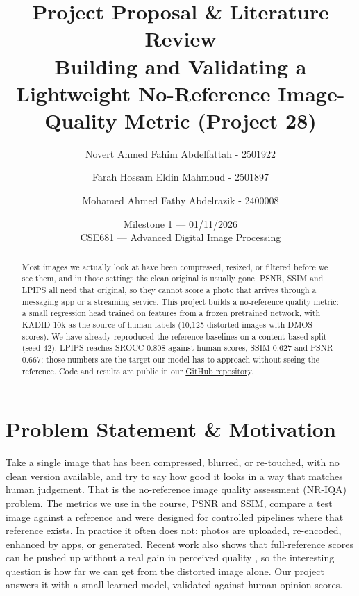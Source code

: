 \documentclass[11pt]{article}
\title{\LARGE Project Proposal \& Literature Review \\[4pt]
\large Building and Validating a Lightweight No-Reference Image-Quality Metric (Project 28)}
\author{
  Novert Ahmed Fahim Abdelfattah - 2501922 \and
  Farah Hossam Eldin Mahmoud - 2501897 \and
  Mohamed Ahmed Fathy Abdelrazik - 2400008
}
\date{Milestone 1 --- 01/11/2026 \\{} CSE681 --- Advanced Digital Image Processing}
\begin{document}
\maketitle

\begin{abstract}
Most images we actually look at have been compressed, resized, or filtered before we see
them, and in those settings the clean original is usually gone. PSNR, SSIM and LPIPS all
need that original, so they cannot score a photo that arrives through a messaging app or a
streaming service. This project builds a no-reference quality metric: a small regression
head trained on features from a frozen pretrained network, with KADID-10k as the source of
human labels (10,125 distorted images with DMOS scores). We have already reproduced the
reference baselines on a content-based split (seed 42). LPIPS reaches SROCC 0.808 against
human scores, SSIM 0.627 and PSNR 0.667; those numbers are the target our model has to
approach without seeing the reference. Code and results are public in our
\href{https://github.com/mo1998/dip-project-28-nr-iqa}{GitHub repository}.
\end{abstract}

\section{Problem Statement \& Motivation}
\label{sec:motivation}
Take a single image that has been compressed, blurred, or re-touched, with no clean version
available, and try to say how good it looks in a way that matches human judgement. That is
the no-reference image quality assessment (NR-IQA) problem. The metrics we use in the
course, PSNR and SSIM, compare a test image against a reference and were designed for
controlled pipelines where that reference exists. In practice it often does not: photos are
uploaded, re-encoded, enhanced by apps, or generated. Recent work also shows that
full-reference scores can be pushed up without a real gain in perceived quality
\citep{siniukov2022limitations, chen2025afine}, so the interesting question is how far we
can get from the distorted image alone. Our project answers it with a small learned model,
validated against human opinion scores.
\end{document}
